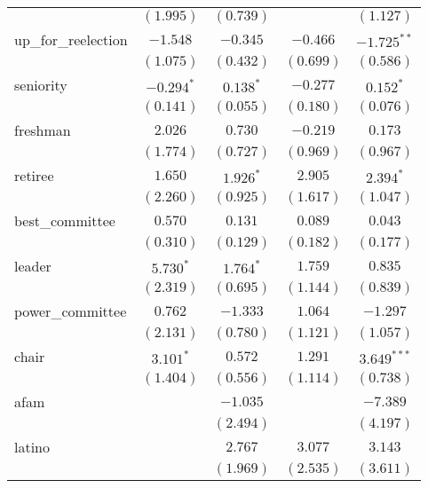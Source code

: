 \documentclass[12pt]{article}
\begin{document}
\begin{table}[H]
\begin{center}
\begin{tabular}{l c c c c }
			& $(1.995)$     & $(0.739)$     &                & $(1.127)$     \\
			up\_for\_reelection           & $-1.548$      & $-0.345$      & $-0.466$       & $-1.725^{**}$ \\
			& $(1.075)$     & $(0.432)$     & $(0.699)$      & $(0.586)$     \\
			seniority                     & $-0.294^{*}$  & $0.138^{*}$   & $-0.277$       & $0.152^{*}$   \\
			& $(0.141)$     & $(0.055)$     & $(0.180)$      & $(0.076)$     \\
			freshman                      & $2.026$       & $0.730$       & $-0.219$       & $0.173$       \\
			& $(1.774)$     & $(0.727)$     & $(0.969)$      & $(0.967)$     \\
			retiree                       & $1.650$       & $1.926^{*}$   & $2.905$        & $2.394^{*}$   \\
			& $(2.260)$     & $(0.925)$     & $(1.617)$      & $(1.047)$     \\
			best\_committee               & $0.570$       & $0.131$       & $0.089$        & $0.043$       \\
			& $(0.310)$     & $(0.129)$     & $(0.182)$      & $(0.177)$     \\
			leader                        & $5.730^{*}$   & $1.764^{*}$   & $1.759$        & $0.835$       \\
			& $(2.319)$     & $(0.695)$     & $(1.144)$      & $(0.839)$     \\
			power\_committee              & $0.762$       & $-1.333$      & $1.064$        & $-1.297$      \\
			& $(2.131)$     & $(0.780)$     & $(1.121)$      & $(1.057)$     \\
			chair                         & $3.101^{*}$   & $0.572$       & $1.291$        & $3.649^{***}$ \\
			& $(1.404)$     & $(0.556)$     & $(1.114)$      & $(0.738)$     \\
			afam                          &               & $-1.035$      &                & $-7.389$      \\
			&               & $(2.494)$     &                & $(4.197)$     \\
			latino                        &               & $2.767$       & $3.077$        & $3.143$       \\
			&               & $(1.969)$     & $(2.535)$      & $(3.611)$     \\

\end{tabular}
\end{center}
\end{table}
\end{document}
